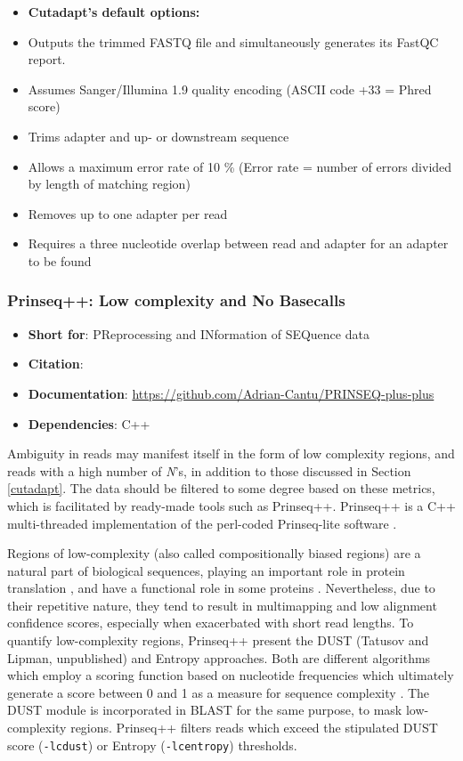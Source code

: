 \begin{itemize}\itemsep0em
\item[] \textbf{Cutadapt's default options:}
\item Outputs the trimmed FASTQ file and simultaneously generates its FastQC report.
\item Assumes Sanger/Illumina 1.9 quality encoding (ASCII code +33 = Phred score)
\item Trims adapter and up- or downstream sequence
\item Allows a maximum error rate of 10 \% (Error rate = number of errors divided by length of matching region)
\item Removes up to one adapter per read
\item Requires a three nucleotide overlap between read and adapter for an adapter to be found
\end{itemize}


\subsubsection{Prinseq++: Low complexity and No Basecalls}
\begin{itemize}\itemsep-0.5em
\item[] \textbf{Short for}: 				PReprocessing and INformation of SEQuence data
\item[] \textbf{Citation}: 				\cite{prinseq++}
\item[] \textbf{Documentation}: 	\url{https://github.com/Adrian-Cantu/PRINSEQ-plus-plus}
\item[] \textbf{Dependencies}: C++
\end{itemize}
Ambiguity in reads may manifest itself in the form of low complexity regions, and reads with a high number of \textit{N}'s, in addition to those discussed in Section \ref{cutadapt}. The data should be filtered to some degree based on these metrics, which is facilitated by ready-made tools such as Prinseq++. Prinseq++ is a C++ multi-threaded implementation of the perl-coded Prinseq-lite software \citep{schmieder2011quality}. 

Regions of low-complexity (also called compositionally biased regions) are a natural part of biological sequences, playing an important role in protein translation \citep{frugier2010low}, and have a functional role in some proteins \citep{ntountoumi2019low}. Nevertheless, due to their repetitive nature, they tend to result in multimapping and low alignment confidence scores, especially when exacerbated with short read lengths. To quantify low-complexity regions, Prinseq++ present the DUST (Tatusov and Lipman, unpublished) and Entropy approaches. Both are different algorithms which employ a scoring function based on nucleotide frequencies which ultimately generate a score between 0 and 1 as a measure for sequence complexity  \citep{morgulis2006fast}. The DUST module is incorporated in BLAST \citep{altschul1997gapped} for the same purpose, to mask low-complexity regions. Prinseq++ filters reads which exceed the stipulated DUST score (\texttt{-lc\textunderscore dust}) or Entropy (\texttt{-lc\textunderscore entropy}) thresholds.


